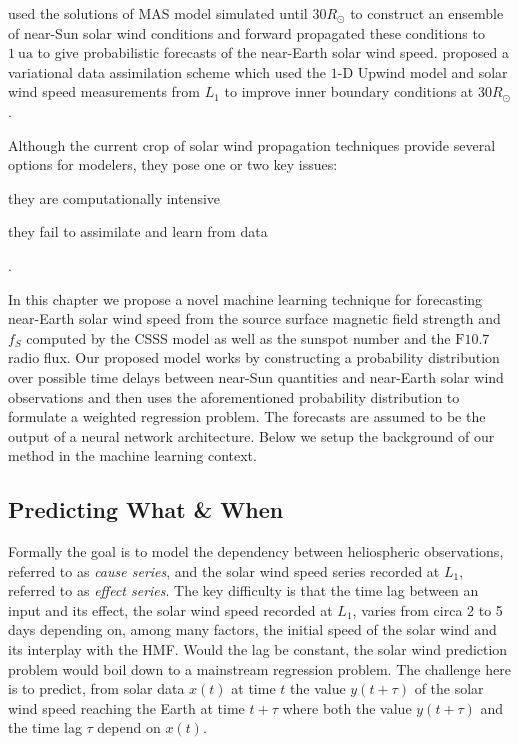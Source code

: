 \citet{Owens2017} used the solutions of MAS model simulated until $30R_{\odot}$ to construct an ensemble of near-Sun 
solar wind conditions and forward propagated these conditions to $\SI{1}{\astronomicalunit}$ to give probabilistic 
forecasts of the near-Earth solar wind speed. \citet{Owens2019} proposed a variational data assimilation scheme which 
used the $1\textrm{-}\text{D}$ Upwind model and solar wind speed measurements from $L_1$ to improve inner boundary 
conditions at $30R_{\odot}$.

Although the current crop of solar wind propagation techniques provide several options for modelers, they pose 
one or two key issues: 
\begin{enumerate*} 
  \item they are computationally intensive 
  \item they fail to assimilate and learn from data 
\end{enumerate*}. 

In this chapter we propose a novel machine learning technique for forecasting near-Earth solar wind speed from the 
source surface magnetic field strength and $f_S$ computed by the CSSS model as well as the sunspot number and 
the $\mathrm{F}10.7$ radio flux. Our proposed model works by constructing a probability distribution over possible 
time delays between near-Sun quantities and near-Earth solar wind observations and then uses the aforementioned 
probability distribution to formulate a weighted regression problem. The forecasts are assumed to be the output of a 
neural network architecture. Below we setup the background of our method in the machine learning context.

\subsection{Predicting What \& When}\label{sec:dtlrintro}
Formally the goal is to model the dependency between heliospheric observations, referred to as {\em cause series}, 
and the solar wind speed series recorded at $L_1$, referred to as {\em effect series}. The key difficulty is that 
the time lag between an input and its effect, the solar wind speed recorded at $L_1$, varies from circa 2 to 5 days 
depending on, among many factors, the initial speed of the solar wind and its interplay with the HMF. Would the 
lag be constant, the solar wind prediction problem would boil down to a mainstream regression problem. The challenge 
here is to predict, from solar data $x(t)$ at time $t$ the value $y(t+\tau)$ of the solar wind speed reaching the 
Earth at time $t+\tau$ where both the value $y(t+\tau)$ and the time lag $\tau$ depend on $x(t)$.

